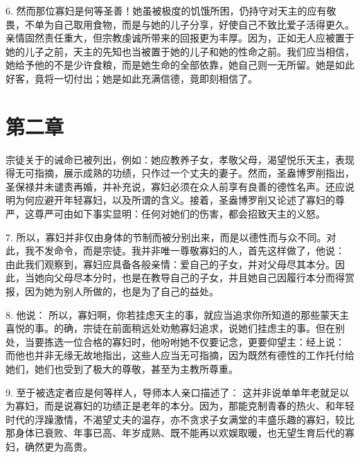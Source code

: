 6. 然而那位寡妇是何等圣善！她虽被极度的饥饿所困，仍持守对天主的应有敬畏，不单为自己取用食物，而是与她的儿子分享，好使自己不致比爱子活得更久。亲情固然责任重大，但宗教虔诚所带来的回报更为丰厚。因为，正如无人应被置于她的儿子之前，天主的先知也当被置于她的儿子和她的性命之前。我们应当相信，她给予他的不是少许食粮，而是她生命的全部依靠，她自己则一无所留。她是如此好客，竟将一切付出；她是如此充满信德，竟即刻相信了。\par


\section{第二章}

宗徒关于的诫命已被列出，例如：她应教养子女，孝敬父母，渴望悦乐天主，表现得无可指摘，展示成熟的功绩，只作过一个丈夫的妻子。然而，圣盎博罗削指出，圣保禄并未谴责再婚，并补充说，寡妇必须在众人前享有良善的德性名声。还应说明为何应避开年轻寡妇，以及所谓的含义。接着，圣盎博罗削又论述了寡妇的尊严，这尊严可由如下事实显明：任何对她们的伤害，都会招致天主的义怒。\par

7. 所以，寡妇并非仅由身体的节制而被分别出来，而是以德性而与众不同。对此，我不发命令，而是宗徒。我并非唯一尊敬寡妇的人，首先这样做了，他说： 由此我们观察到，寡妇应具备各般亲情：爱自己的子女，并对父母尽其本分。因此，当她向父母尽本分时，也是在教导自己的子女，并且她自己因履行本分而得赏报，因为她为别人所做的，也是为了自己的益处。\par

8. 他说： 所以，寡妇啊，你若挂虑天主的事，就应当追求你所知道的那些蒙天主喜悦的事。的确，宗徒在前面稍远处劝勉寡妇追求，说她们挂虑主的事。但在别处，当要拣选一位合格的寡妇时，他吩咐她不仅要记念，更要仰望主：经上说： 而他也并非无缘无故地指出，这些人应当无可指摘，因为既然有德性的工作托付给她们，她们也受到了极大的尊敬，甚至为主教所尊重。\par

9. 至于被选定者应是何等样人，导师本人亲口描述了： 这并非说单单年老就足以为寡妇，而是说寡妇的功绩正是老年的本分。因为，那能克制青春的热火、和年轻时代的浮躁激情，不渴望丈夫的温存，亦不贪求子女满堂的丰盛乐趣的寡妇，较比那身体已衰败、年事已高、年岁成熟、既不能再以欢娱取暖，也无望生育后代的寡妇，确然更为高贵。\par

